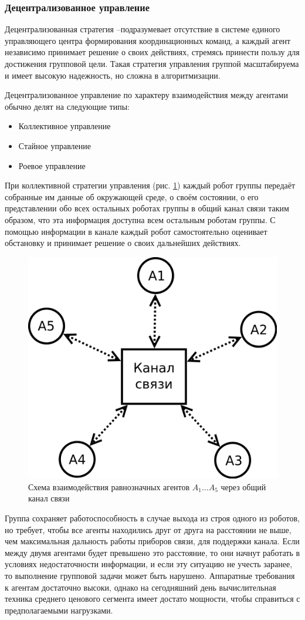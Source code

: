 \documentclass[a4paper, 14pt]{extarticle}
\let\Oldsubsubsection\subsubsection
\renewcommand{\subsubsection}{\FloatBarrier\Oldsubsubsection}
\begin{document}
\subsubsection{Децентрализованное управление}
Децентрализованная стратегия –подразумевает отсутствие в системе
единого управляющего центра формирования координационных команд, а
каждый агент независимо принимает решение о своих действиях, стремясь
принести пользу для достижения групповой цели. Такая стратегия управления
группой масштабируема и имеет высокую надежность, но сложна в
алгоритмизации. \par
Децентрализованное управление по характеру взаимодействия между агентами обычно делят на следующие типы: \par
\begin{itemize}
	\item Коллективное управление
	\item Стайное управление
	\item Роевое управление
\end{itemize}
\smallskip
При коллективной стратегии управления (рис. \ref{fig:decen-platoon-collective}) каждый робот группы передаёт  собранные им данные об окружающей среде, о своём состоянии, о его представлении обо всех остальных роботах группы в общий канал связи таким образом, что эта информация доступна всем остальным роботам группы. С помощью информации в канале каждый робот самостоятельно оценивает обстановку и принимает решение о своих дальнейших действиях. \par
\begin{figure}[!htbp]
	\centering
	\includegraphics[width=0.6\linewidth]{others/decen-platoon-collective2}
	\caption{Схема взаимодействия равнозначных агентов $A_1$...$A_5$ через общий канал связи}
	\label{fig:decen-platoon-collective}
\end{figure}
Группа сохраняет работоспособность в случае выхода из строя одного из роботов, но требует, чтобы все агенты находились друг от друга на расстоянии не выше, чем максимальная дальность работы приборов связи, для поддержки канала. Если между двумя агентами будет превышено это расстояние, то они начнут работать в условиях недостаточности информации, и если эту ситуацию не учесть заранее, то выполнение групповой задачи может быть нарушено. Аппаратные требования к агентам достаточно высоки, однако на сегодняшний день вычислительная техника среднего ценового сегмента имеет достато мощности, чтобы справиться с предполагаемыми нагрузками. \par
\end{document}
